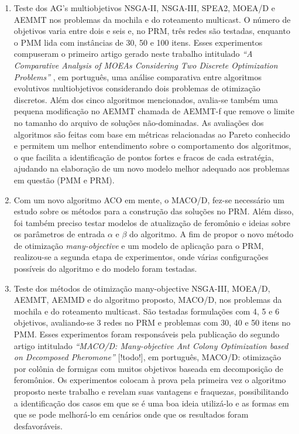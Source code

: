 \begin{enumerate}
	\item Teste dos AG's multiobjetivos NSGA-II, NSGA-III, SPEA2, MOEA/D e AEMMT nos problemas da mochila e do roteamento multicast. O número de objetivos varia entre dois e seis e, no PRM, três redes são testadas, enquanto o PMM lida com instâncias de 30, 50 e 100 itens. Esses experimentos compuseram o primeiro artigo gerado neste trabalho intitulado \textit{``A Comparative Analysis of MOEAs Considering Two Discrete Optimization Problems''} \cite{Franca2017}, em português, uma análise comparativa entre algoritmos evolutivos multiobjetivos considerando dois problemas de otimização discretos. Além dos cinco algoritmos mencionados, avalia-se também uma pequena modificação no AEMMT chamada de AEMMT-f que remove o limite no tamanho do arquivo de soluções não-dominadas. As avaliações dos algoritmos são feitas com base em métricas relacionadas ao Pareto conhecido e permitem um melhor entendimento sobre o comportamento dos algoritmos, o que facilita a identificação de pontos fortes e fracos de cada estratégia, ajudando na elaboração de um novo modelo melhor adequado aos problemas em questão (PMM e PRM).
	\item Com um novo algoritmo ACO em mente, o MACO/D, fez-se necessário um estudo sobre os métodos para a construção das soluções no PRM. Além disso, foi também preciso testar modelos de atualização de feromônio e ideias sobre os parâmetros de entrada $\alpha$ e $\beta$ do algoritmo. A fim de propor o novo método de otimização \textit{many-objective} e um modelo de aplicação para o PRM, realizou-se a segunda etapa de experimentos, onde várias configurações possíveis do algoritmo e do modelo foram testadas.
	\item Teste dos métodos de otimização many-objective NSGA-III, MOEA/D, AEMMT, AEMMD e do algoritmo proposto, MACO/D, nos problemas da mochila e do roteamento multicast. São testadas formulações com 4, 5 e 6 objetivos, avaliando-se 3 redes no PRM e problemas com 30, 40 e 50 itens no PMM. Esses experimentos foram responsáveis pela publicação do segundo artigo intitulado \textit{``MACO/D: Many-objective Ant Colony Optimization based on Decomposed Pheromone''} [!todo!], em português, MACO/D: otimização por colônia de formigas com muitos objetivos baseada em decomposição de feromônios. Os experimentos colocam à prova pela primeira vez o algoritmo proposto neste trabalho e revelam suas vantagens e fraquezas, possibilitando a identificação dos casos em que se é uma boa ideia utilizá-lo e as formas em que se pode melhorá-lo em cenários onde que os resultados foram desfavoráveis.

\end{enumerate}
